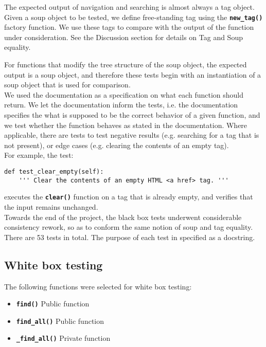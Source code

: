 \documentclass[10pt]{article}
\newcommand{\tbt}[1]{\texttt{\textbf{#1}}}
\begin{document}
The expected output of navigation and searching is almost always a tag object. Given a soup object to be tested, we define free-standing tag using the \tbt{new\_tag()} factory function. We use these tags to compare with the output of the function under consideration. See the Discussion section for details on Tag and Soup equality. 

For functions that modify the tree structure of the soup object, the expected output is a soup object, and therefore these tests begin with an instantiation of a soup object that is used for comparison. \\

We used the documentation as a specification on what each function should return. We let the documentation inform the tests, i.e. the documentation specifies the what is supposed to be the correct behavior of a given function, and we test whether the function behaves as stated in the documentation. Where applicable, there are tests to test negative results (e.g. searching for a tag that is not present), or edge cases (e.g. clearing the contents of an empty tag). \\

For example, the test:
\begin{lstlisting}[style = pythonstyle]
    def test_clear_empty(self):
    ''' Clear the contents of an empty HTML <a href> tag. '''
\end{lstlisting}
executes the \tbt{clear()} function on a tag that is already empty, and verifies that the input remains unchanged. \\

Towards the end of the project, the black box tests underwent considerable consistency rework, so as to conform the same notion of soup and tag equality. \\

There are 53 tests in total. The purpose of each test in specified as a docstring.


\subsection{White box testing}

The following functions were selected for white box testing:

\begin{itemize}
  \setlength\itemsep{-0.05em}
  \item \tbt{find()} \qquad Public function
  \item \tbt{find\_all()} \qquad Public function
  \item \tbt{\_find\_all()} \qquad Private function
\end{itemize}
\end{document}
